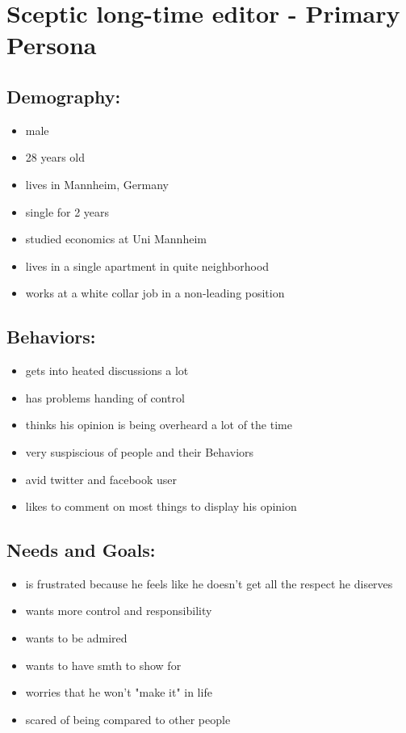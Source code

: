 \documentclass{article}
\date{11.11.2015}
\begin{document}
\section{Sceptic long-time editor - Primary Persona}

\subsection{Demography:}
\begin{itemize}
 \item male
 \item 28 years old
 \item lives in Mannheim, Germany
 \item single for 2 years
 \item studied economics at Uni Mannheim
 \item lives in a single apartment in quite neighborhood
 \item works at a white collar job in a non-leading position
\end{itemize}

\subsection{Behaviors:}
\begin{itemize}
\item gets into heated discussions a lot
\item has problems handing of control
\item thinks his opinion is being overheard a lot of the time
\item very suspiscious of people and their Behaviors
\item avid twitter and facebook user
\item likes to comment on most things to display his opinion
\end{itemize}

\subsection{Needs and Goals:}
\begin{itemize}
 \item is frustrated because he feels like he doesn't get all the respect he diserves
 \item wants more control and responsibility
 \item wants to be admired
 \item wants to have smth to show for
 \item worries that he won't "make it" in life
 \item scared of being compared to other people
\end{itemize}
\end{document}
